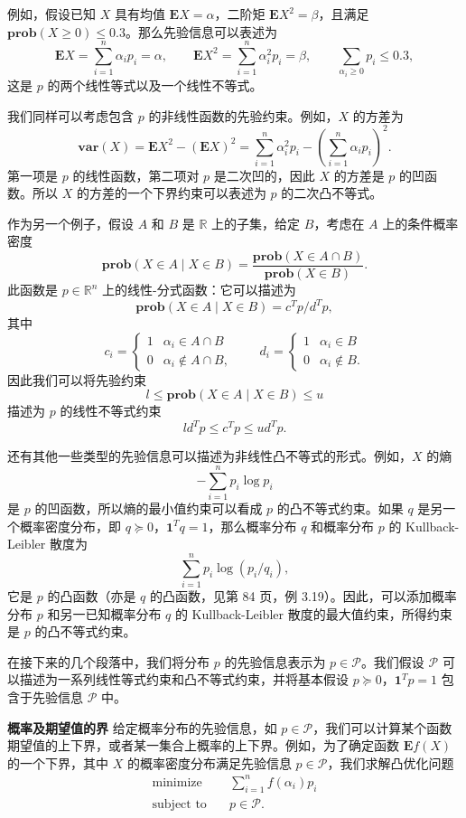 \documentclass[UTF8,12pt,a4paper,fontset=fandol]{ctexart}
\begin{document}
例如，假设已知 $X$ 具有均值 $\mathbf{E}X=\alpha$，二阶矩 $\mathbf{E}X^2=\beta$，且满足 $\mathbf{prob}(X\geq 0)\leq 0.3$。那么先验信息可以表述为
\[
\mathbf{E}X=\sum_{i=1}^n \alpha_i p_i=\alpha,\qquad
\mathbf{E}X^2=\sum_{i=1}^n \alpha_i^2 p_i=\beta,\qquad
\sum_{\alpha_i\geq 0}p_i\leq 0.3,
\]
这是 $p$ 的两个线性等式以及一个线性不等式。

我们同样可以考虑包含 $p$ 的非线性函数的先验约束。例如，$X$ 的方差为
\[
\mathbf{var}(X)=\mathbf{E}X^2-(\mathbf{E}X)^2
=\sum_{i=1}^n \alpha_i^2p_i-\left(\sum_{i=1}^n\alpha_i p_i\right)^2.
\]
第一项是 $p$ 的线性函数，第二项对 $p$ 是二次凹的，因此 $X$ 的方差是 $p$ 的凹函数。所以 $X$ 的方差的一个下界约束可以表述为 $p$ 的二次凸不等式。

作为另一个例子，假设 $A$ 和 $B$ 是 $\mathbb{R}$ 上的子集，给定 $B$，考虑在 $A$ 上的条件概率密度
\[
\mathbf{prob}(X\in A\mid X\in B)=\frac{\mathbf{prob}(X\in A\cap B)}{\mathbf{prob}(X\in B)}.
\]
此函数是 $p\in\mathbb{R}^n$ 上的线性-分式函数：它可以描述为
\[
\mathbf{prob}(X\in A\mid X\in B)=c^Tp/d^Tp,
\]
其中
\[
c_i=
\begin{cases}
1 & \alpha_i\in A\cap B\\
0 & \alpha_i\notin A\cap B,
\end{cases}
\qquad
d_i=
\begin{cases}
1 & \alpha_i\in B\\
0 & \alpha_i\notin B.
\end{cases}
\]
因此我们可以将先验约束
\[
l\leq \mathbf{prob}(X\in A\mid X\in B)\leq u
\]
描述为 $p$ 的线性不等式约束
\[
ld^Tp\leq c^Tp\leq ud^Tp.
\]

还有其他一些类型的先验信息可以描述为非线性凸不等式的形式。例如，$X$ 的熵
\[
-\sum_{i=1}^n p_i\log p_i
\]
是 $p$ 的凹函数，所以熵的最小值约束可以看成 $p$ 的凸不等式约束。如果 $q$ 是另一个概率密度分布，即 $q\succeq 0$，$\mathbf{1}^Tq=1$，那么概率分布 $q$ 和概率分布 $p$ 的 Kullback-Leibler 散度为
\[
\sum_{i=1}^n p_i\log(p_i/q_i),
\]
它是 $p$ 的凸函数（亦是 $q$ 的凸函数，见第 84 页，例 3.19）。因此，可以添加概率分布 $p$ 和另一已知概率分布 $q$ 的 Kullback-Leibler 散度的最大值约束，所得约束是 $p$ 的凸不等式约束。

在接下来的几个段落中，我们将分布 $p$ 的先验信息表示为 $p\in\mathcal{P}$。我们假设 $\mathcal{P}$ 可以描述为一系列线性等式约束和凸不等式约束，并将基本假设 $p\succeq 0$，$\mathbf{1}^Tp=1$ 包含于先验信息 $\mathcal{P}$ 中。

\noindent\textbf{概率及期望值的界}\quad
给定概率分布的先验信息，如 $p\in\mathcal{P}$，我们可以计算某个函数期望值的上下界，或者某一集合上概率的上下界。例如，为了确定函数 $\mathbf{E}f(X)$ 的一个下界，其中 $X$ 的概率密度分布满足先验信息 $p\in\mathcal{P}$，我们求解凸优化问题
\[
\begin{aligned}
\text{minimize}\quad & \sum_{i=1}^n f(\alpha_i)p_i\\
\text{subject to}\quad & p\in\mathcal{P}.
\end{aligned}
\]
\end{document}
